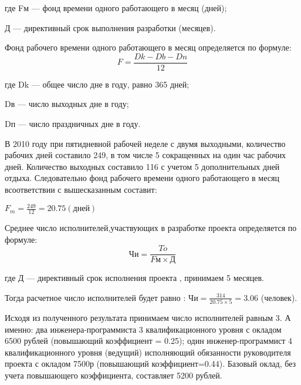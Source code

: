 \begin{ESKDexplanation}
    \item[где ]{} Fм --- фонд времени одного работающего в месяц (дней);
    \item{} Д --- директивный срок выполнения разработки (месяцев).
\end{ESKDexplanation}

Фонд рабочего времени одного работающего в месяц определяется по формуле:
\begin{equation}
    F = \frac{Dk - Db - Dn}{12}
\end{equation}

\begin{ESKDexplanation}
    \item[где ]{} Dk --- общее число дне в году, равно 365 дней;
    \item{} Dв --- число выходных дне в году;
    \item{} Dп --- число праздничных дне в году.
\end{ESKDexplanation}

В 2010 году при пятидневной рабочей неделе с двумя выходными, количество рабочих дней составило 249,
в том числе 5 сокращенных на один час рабочих дней. Количество выходных составило 116 с учетом 5
дополнительных дней отдыха. Следовательно фонд рабочего времени одного работающего в месяц всоответствии
с вышесказанным составит:

$F_m = \frac{249}{12} = 20.75 (дней)$


Среднее число исполнителей,участвующих в разработке проекта определяется по формуле:
\begin{equation}
	Чи = \frac{To} {Fм \times{} Д}
\end{equation}

\begin{ESKDexplanation}
	\item[где ] Д --- директивный срок исполнения проекта , принимаем 5 месяцев.
\end{ESKDexplanation}


Тогда расчетное число исполнителей будет равно : $Чи = \frac{314}{20.75 \times{} 5} = 3.06$ (человек).

\begin{par}
Исходя из полученного результата принимаем число исполнителей равным 3.
А именно: два инженера-программиста 3 квалификационного уровня с окладом 6500 рублей (повышающий коэффициент = 0.25);
один инженер-программист 4 квалификационного уровня (ведущий) исполняющий обязанности руководителя
проекта с окладом 7500р (повышающий коэффициент=0.44). Базовый оклад, без учета повышающего коэффициента,
составляет 5200 рублей.
\end{par}

